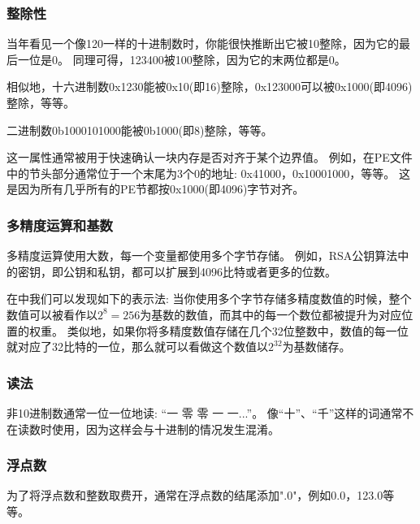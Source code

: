 \subsubsection{整除性}

当年看见一个像120一样的十进制数时，你能很快推断出它被10整除，因为它的最后一位是0。
同理可得，123400被100整除，因为它的末两位都是0。

相似地，十六进制数0x1230能被0x10(即16)整除，0x123000可以被0x1000(即4096)整除，等等。

二进制数0b1000101000能被0b1000(即8)整除，等等。

这一属性通常被用于快速确认一块内存是否对齐于某个边界值。
例如，在\ac{PE}文件中的节头部分通常位于一个末尾为3个0的地址: 0x41000，0x10001000，等等。
这是因为所有几乎所有的\ac{PE}节都按0x1000(即4096)字节对齐。

\subsubsection{多精度运算和基数}

多精度运算使用大数，每一个变量都使用多个字节存储。
例如，RSA公钥算法中的密钥，即公钥和私钥，都可以扩展到4096比特或者更多的位数。

在中我们可以发现如下的表示法: 当你使用多个字节存储多精度数值的时候，整个数值可以被看作以$2^8=256$为基数的数值，而其中的每一个数位都被提升为对应位置的权重。
类似地，如果你将多精度数值存储在几个32位整数中，数值的每一位就对应了32比特的一位，那么就可以看做这个数值以$2^{32}$为基数储存。

\subsubsection{读法}

非10进制数通常一位一位地读: “一 零 零 一 一...”。
像“十”、“千”这样的词通常不在读数时使用，因为这样会与十进制的情况发生混淆。

\subsubsection{浮点数}

为了将浮点数和整数取费开，通常在浮点数的结尾添加".0"，例如0.0，123.0等等。
